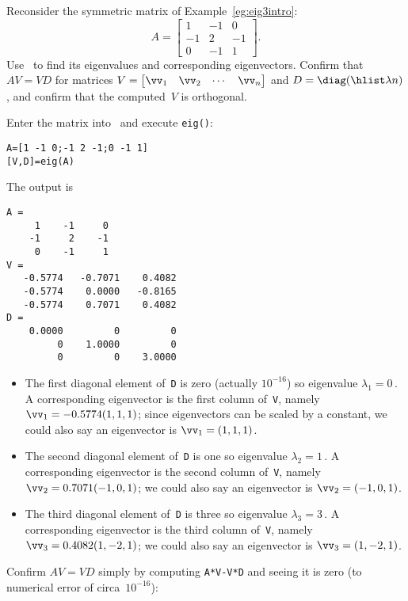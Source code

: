 \begin{example} \label{eg:eig3eig}
Reconsider the symmetric matrix of Example~\ref{eg:eig3intro}:
\begin{equation*}
A=\begin{bmatrix} 1&-1&0\\-1&2&-1\\0&-1&1 \end{bmatrix}.
\end{equation*}
Use \script\ to find its eigenvalues and corresponding eigenvectors.
Confirm that \(AV=VD\) for matrices \(V=\begin{bmatrix} \vv_1&\vv_2&\cdots&\vv_n \end{bmatrix}\) and \(D=\diag(\hlist\lambda n)\), and confirm that the computed~\(V\) is orthogonal.
\begin{solution} 
Enter the matrix into \script\ and execute \verb|eig()|:
\setbox\ajrqrbox\hbox{}%
\marginpar{\usebox{\ajrqrbox}}%
\begin{verbatim}
A=[1 -1 0;-1 2 -1;0 -1 1]
[V,D]=eig(A)
\end{verbatim}
The output is
\begin{verbatim}
A =
     1    -1     0
    -1     2    -1
     0    -1     1
V =
   -0.5774   -0.7071    0.4082
   -0.5774    0.0000   -0.8165
   -0.5774    0.7071    0.4082
D =
    0.0000         0         0
         0    1.0000         0
         0         0    3.0000
\end{verbatim}
\begin{itemize}
\item The first diagonal element of~\verb|D| is zero (actually \(10^{-16}\)) so eigenvalue \(\lambda_1=0\)\,.
A corresponding eigenvector is the first column of~\verb|V|, namely \(\vv_1=-0.5774(1,1,1)\);  since eigenvectors can be scaled by a constant, we could also say an eigenvector is \(\vv_1=(1,1,1)\).
\item The second diagonal element of~\verb|D| is one so eigenvalue \(\lambda_2=1\)\,.
A corresponding eigenvector is the second column of~\verb|V|, namely \(\vv_2=0.7071(-1,0,1)\);  we could also say an eigenvector is \(\vv_2=(-1,0,1)\).
\item The third diagonal element of~\verb|D| is three so eigenvalue \(\lambda_3=3\)\,.
A corresponding eigenvector is the third column of~\verb|V|, namely \(\vv_3=0.4082(1,-2,1)\);  we could also say an eigenvector is \(\vv_3=(1,-2,1)\).
\end{itemize}
Confirm \(AV=VD\) simply by computing \verb|A*V-V*D| and seeing it is zero (to numerical error of circa~\(10^{-16}\)):

\end{solution}
\end{example}
